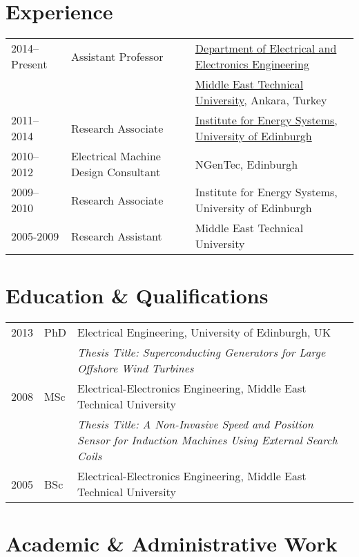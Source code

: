 \documentclass[a4paper,12pt]{article}
\begin{document}
\maketitle

\section{Experience}

\begin{tabular}{lp{3.6cm}l}
2014--Present & Assistant Professor & \href{http://eee.metu.edu.tr}{Department of Electrical and Electronics Engineering} \\ 
 &  & \href{http://metu.edu.tr}{Middle East Technical University}, Ankara, Turkey  \\ 
2011--2014 & Research Associate & \href{https://www.eng.ed.ac.uk/research/institutes/ies}{Institute for Energy Systems}, \href{https://www.ed.ac.uk}{University of Edinburgh}  \\ 
2010--2012 & Electrical Machine Design Consultant & NGenTec, Edinburgh\\
2009--2010 & Research Associate & Institute for Energy Systems, University of Edinburgh\\
2005-2009 & Research Assistant & Middle East Technical University\\ 
\end{tabular}
 
\section{Education \& Qualifications}
\begin{tabular}{llp{12cm}}
 2013 & PhD & Electrical Engineering, University of Edinburgh, UK\\  
& & \textit{Thesis Title: Superconducting Generators for Large Offshore Wind Turbines} \\ 
 2008 & MSc & Electrical-Electronics Engineering, Middle East Technical University \\
& & \textit{Thesis Title: A Non-Invasive Speed and Position Sensor for Induction Machines Using External Search Coils}\\
 2005 & BSc & Electrical-Electronics Engineering, Middle East Technical University \\

\end{tabular}

\section{Academic \& Administrative Work}
\end{document}
